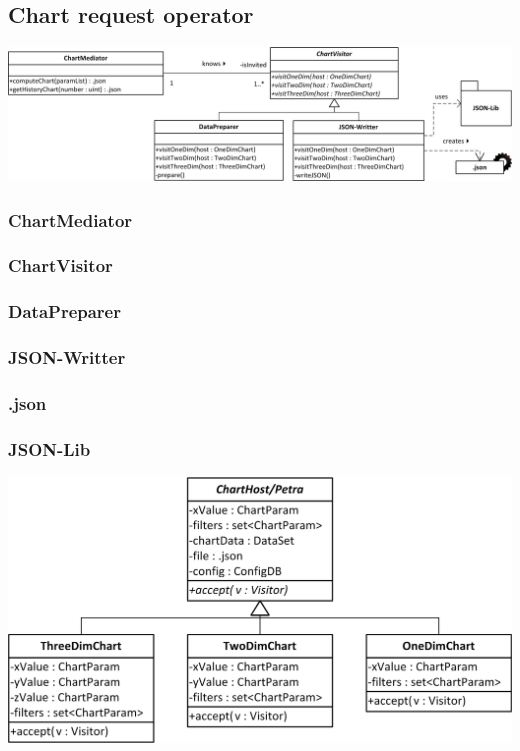 \subsection{Chart request operator}

\begin{center}
\includegraphics[width=1\linewidth]{Pictures/Parts/MediVisi.png}
\end{center}  
\subsubsection*{ChartMediator}
\subsubsection*{ChartVisitor}
\subsubsection*{DataPreparer}
\subsubsection*{JSON-Writter}
\subsubsection*{.json}
\subsubsection*{JSON-Lib}


\begin{center}
\includegraphics{Pictures/Parts/Petra.png}
\end{center}  
